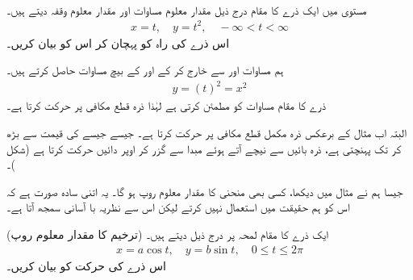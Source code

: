 \\
مستوی  میں ایک ذرے کا مقام  درج ذیل  مقدار معلوم مساوات اور مقدار معلوم وقفہ دیتے ہیں۔
\begin{align*}
x=t,\quad y=t^2,\quad -\infty <t< \infty
\end{align*}
اس ذرے کی راہ کو پہچان کر اس کو بیان کریں۔

ہم مساوات  اور  سے  خارج کر کے  اور  کے بیچ مساوات حاصل کرتے ہیں۔
\begin{align*}
y=(t)^2=x^2
\end{align*}
ذرے کا مقام مساوات  کو مطمئن کرتی ہے لہٰذا ذرہ قطع مکافی  پر حرکت کرتا ہے۔

البتہ اب مثال  کے برعکس ذرہ مکمل قطع مکافی پر حرکت کرتا ہے۔ جیسے جیسے  کی قیمت  سے بڑھ کر    تک پہنچتی ہے، ذرہ بائیں سے نیچے آتے ہوئے مبدا سے گزر کر اوپر دائیں حرکت کرتا ہے (شکل )۔

جیسا ہم نے مثال  میں دیکھا، کسی بھی منحنی  کا مقدار معلوم روپ  ہو گا۔ یہ اتنی سادہ صورت ہے کہ اس کو ہم حقیقت میں استعمال نہیں کرتے  لیکن اس سے نظریہ با آسانی سمجھ آتا ہے۔

 (ترخیم کا مقدار معلوم روپ)
ایک ذرے کا مقام   لمحہ  پر    درج ذیل  دیتے ہیں۔
\begin{align*}
x=a\cos t,\quad y=b\sin t,\quad 0\le t\le 2\pi
\end{align*}
اس ذرے کی حرکت کو بیان کریں۔

